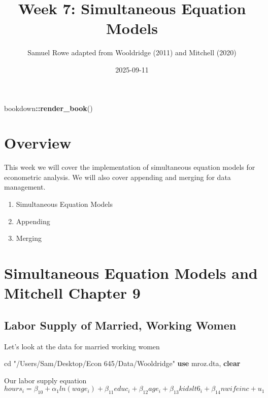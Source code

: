 \documentclass[
]{book}
\title{Week 7: Simultaneous Equation Models}
\author{Samuel Rowe adapted from Wooldridge (2011) and Mitchell (2020)}
\date{2025-09-11}
\newenvironment{Shaded}{\begin{snugshade}}{\end{snugshade}}
\newcommand{\FunctionTok}[1]{\textcolor[rgb]{0.13,0.29,0.53}{\textbf{#1}}}
\newcommand{\KeywordTok}[1]{\textcolor[rgb]{0.13,0.29,0.53}{\textbf{#1}}}
\newcommand{\NormalTok}[1]{#1}
\newcommand{\SpecialCharTok}[1]{\textcolor[rgb]{0.81,0.36,0.00}{\textbf{#1}}}
\newcommand{\StringTok}[1]{\textcolor[rgb]{0.31,0.60,0.02}{#1}}
\providecommand{\tightlist}{%
  \setlength{\itemsep}{0pt}\setlength{\parskip}{0pt}}
\begin{document}
\maketitle

{
\setcounter{tocdepth}{1}
\tableofcontents
}
\begin{Shaded}
\begin{Highlighting}[]
\NormalTok{bookdown}\SpecialCharTok{::}\FunctionTok{render\_book}\NormalTok{()}
\end{Highlighting}
\end{Shaded}

\chapter*{Overview}\label{overview}

This week we will cover the implementation of simultaneous equation models for econometric analysis. We will also cover appending and merging for data management.

\begin{enumerate}
\def\labelenumi{\arabic{enumi}.}
\tightlist
\item
  Simultaneous Equation Models
\item
  Appending
\item
  Merging
\end{enumerate}

\chapter{Simultaneous Equation Models and Mitchell Chapter 9}\label{simultaneous-equation-models-and-mitchell-chapter-9}

\section{Labor Supply of Married, Working Women}\label{labor-supply-of-married-working-women}

Let's look at the data for married working women

\begin{Shaded}
\begin{Highlighting}[]
\NormalTok{cd }\StringTok{"/Users/Sam/Desktop/Econ 645/Data/Wooldridge"}
\KeywordTok{use}\NormalTok{ mroz.dta, }\KeywordTok{clear}
\end{Highlighting}
\end{Shaded}

Our labor supply equation
\[ hours_i= \beta_{10}+ \alpha_1 ln(wage_i) + \beta_{11} educ_i + \beta_{12} age_i + \beta_{13} kidslt6_i + \beta_{14} nwifeinc + u_1 \]
\end{document}
